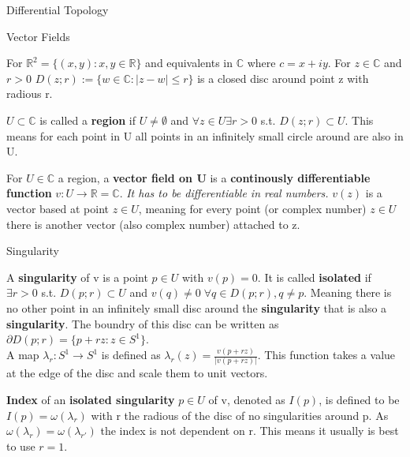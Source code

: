 \documentclass[12pt, letterpaper]{article}
\begin{document}
\begin{section}{Differential Topology}
  \begin{subsection}{Vector Fields}

    For \(\mathbb{R}^{2} = \{ (x, y) : x, y \in \mathbb{R} \}\) and equivalents
    in \(\mathbb{C}\) where \(c = x + iy\). For \(z \in \mathbb{C}\) and \(r > 0\)
    \(D(z; r) := \{ w \in \mathbb{C} : |z - w| \leq r \}\) is a closed disc around
    point z with radious r.

    \(U \subset \mathbb{C}\) is called a \textbf{region} if \(U \neq \emptyset\)
    and \(\forall z \in U \exists r > 0\) s.t. \(D(z; r) \subset U\). This means
    for each point in U all points in an infinitely small circle around are
    also in U.

    For \(U \in \mathbb{C}\) a region, a \textbf{vector field on U} is a
    \textbf{continously differentiable function} \(v: U \to \mathbb{R} = \mathbb{C}\).
    \emph{It has to be differentiable in real numbers.} \(v(z)\) is a vector based
    at point \(z \in U\), meaning for every point (or complex number) \(z \in U\)
    there is another vector (also complex number) attached to z. \\

  \end{subsection}

  \begin{subsection}{Singularity}

    A \textbf{singularity} of v is a point \(p \in U\) with \(v(p) = 0\).
    It is called \textbf{isolated} if \(\exists r > 0\) s.t. \(D(p; r) \subset U\)
    and \(v(q) \neq 0 \; \forall q \in D(p; r), q \neq p\). Meaning there is no other
    point in an infinitely small disc around the \textbf{singularity} that is also
    a \textbf{singularity}.
    The boundry of this disc can be written as \(\partial D(p; r) =
    \{ p + rz : z \in  S^{1} \}\). \\
    A map \(\lambda_{r} : S^{1} \to S^{1}\) is defined as \(\lambda_{r}(z) =
    \frac{v(p + rz)}{|v(p + rz)|}\). This function takes a value at the edge
    of the disc and scale them to unit vectors.

    \textbf{Index} of an \textbf{isolated singularity} \(p \in U\) of v,
    denoted as \(I(p)\), is defined to be \(I(p) = \omega(\lambda_{r})\) with r
    the radious of the disc of no singularities around p. As \(\omega(\lambda_{r})
    = \omega(\lambda_{r'})\) the index is not dependent on r. This means it usually
    is best to use \(r = 1\).

  \end{subsection}


\end{section}
\end{document}
